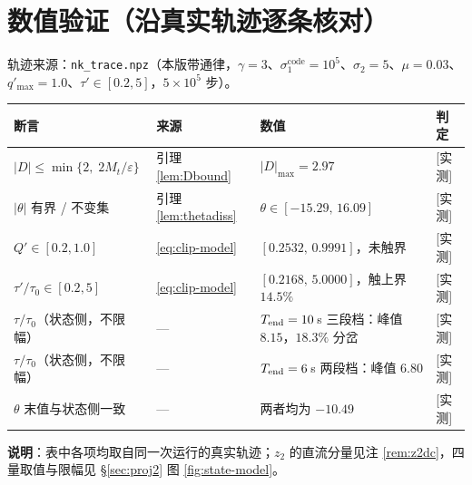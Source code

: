 \documentclass[11pt]{article}
\theoremstyle{remark}\newtheorem{remark}{注}
\newcommand{\pv}[1]{\textsf{[#1]}}
\begin{document}
\section{数值验证（沿真实轨迹逐条核对）}\label{sec:verify}
轨迹来源：\texttt{nk\_trace.npz}（本版带通律，$\gamma=3$、$\sigma_1^{\mathrm{code}}=10^{5}$、$\sigma_2=5$、$\mu=0.03$、$q'_{\max}=1.0$、$\tau'\in[0.2,5]$，$5\times10^{5}$ 步）。
\begin{center}
\footnotesize
\begin{tabular}{@{}llll@{}}
\toprule
断言 & 来源 & 数值 & 判定\\
\midrule
$|D|\le\min\{2,\;2M_t/\varepsilon\}$ & 引理 \ref{lem:Dbound} & $|D|_{\max}=2.97$ & \pv{实测}\\
$|\theta|$ 有界 / 不变集 & 引理 \ref{lem:thetadiss} & $\theta\in[-15.29,\,16.09]$ & \pv{实测}\\
$Q'\in[0.2,1.0]$ & \eqref{eq:clip-model} & $[0.2532,\,0.9991]$，未触界 & \pv{实测}\\
$\tau'/\tau_0\in[0.2,5]$ & \eqref{eq:clip-model} & $[0.2168,\,5.0000]$，触上界 $14.5\%$ & \pv{实测}\\
$\tau/\tau_0$（状态侧，不限幅） & --- & $T_{\rm end}=10$\,s 三段档：峰值 $8.15$，$18.3\%$ 分岔 & \pv{实测}\\
$\tau/\tau_0$（状态侧，不限幅） & --- & $T_{\rm end}=6$\,s 两段档：峰值 $6.80$ & \pv{实测}\\
$\theta$ 末值与状态侧一致 & --- & 两者均为 $-10.49$ & \pv{实测}\\
\bottomrule
\end{tabular}
\end{center}
\textbf{说明}：表中各项均取自同一次运行的真实轨迹；$z_2$ 的直流分量见注 \ref{rem:z2dc}，四量取值与限幅见 \S\ref{sec:proj2} 图 \ref{fig:state-model}。
\end{document}
